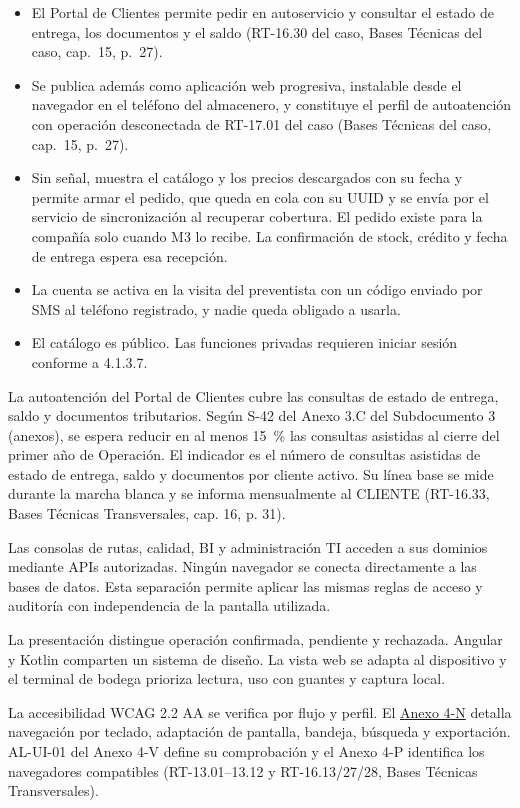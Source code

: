 \begin{itemize}
  \item El Portal de Clientes permite pedir en autoservicio y consultar el estado de entrega, los documentos y el saldo (RT-16.30 del caso, Bases Técnicas del caso, cap.~15, p.~27).
  \item Se publica además como aplicación web progresiva, instalable desde el navegador en el teléfono del almacenero, y constituye el perfil de autoatención con operación desconectada de RT-17.01 del caso (Bases Técnicas del caso, cap.~15, p.~27).
  \item Sin señal, muestra el catálogo y los precios descargados con su fecha y permite armar el pedido, que queda en cola con su UUID y se envía por el servicio de sincronización al recuperar cobertura. El pedido existe para la compañía solo cuando M3 lo recibe. La confirmación de stock, crédito y fecha de entrega espera esa recepción.
  \item La cuenta se activa en la visita del preventista con un código enviado por SMS al teléfono registrado, y nadie queda obligado a usarla.
  \item El catálogo es público. Las funciones privadas requieren iniciar sesión conforme a 4.1.3.7.
\end{itemize}

La autoatención del Portal de Clientes cubre las consultas de estado de entrega, saldo y documentos tributarios. Según S-42 del Anexo 3.C del Subdocumento 3 (anexos), se espera reducir en al menos 15~\% las consultas asistidas al cierre del primer año de Operación. El indicador es el número de consultas asistidas de estado de entrega, saldo y documentos por cliente activo. Su línea base se mide durante la marcha blanca y se informa mensualmente al CLIENTE (RT-16.33, Bases Técnicas Transversales, cap. 16, p. 31).

Las consolas de rutas, calidad, BI y administración TI acceden a sus dominios mediante APIs autorizadas. Ningún navegador se conecta directamente a las bases de datos. Esta separación permite aplicar las mismas reglas de acceso y auditoría con independencia de la pantalla utilizada.

La presentación distingue operación confirmada, pendiente y rechazada. Angular y Kotlin comparten un sistema de diseño. La vista web se adapta al dispositivo y el terminal de bodega prioriza lectura, uso con guantes y captura local.

La accesibilidad WCAG 2.2 AA se verifica por flujo y perfil. El \href{LAFROX-Subdocumento4-Anexos.pdf#anxN:interaccion}{Anexo 4-N} detalla navegación por teclado, adaptación de pantalla, bandeja, búsqueda y exportación. AL-UI-01 del Anexo 4-V define su comprobación y el Anexo 4-P identifica los navegadores compatibles (RT-13.01--13.12 y RT-16.13/27/28, Bases Técnicas Transversales).

